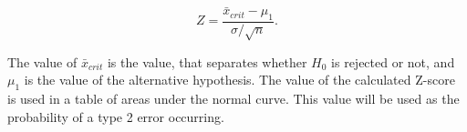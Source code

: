 \begin{equation}
Z=\frac{\bar{x}_{crit}-\mu_1}{\sigma/\sqrt{n}}.
\end{equation}


\noindent The value of $\bar{x}_{crit}$ is the value, that separates whether $H_0$ is rejected or not, and $\mu_1$ is the value of the alternative hypothesis.
The value of the calculated Z-score is used in a table of areas under the normal curve. This value will be used as the probability of a type 2 error occurring.


